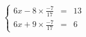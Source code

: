 \documentclass[preview]{standalone}
\begin{document}
\begin{align*}
\left\{ \begin{array}{rcl} 6x - 8\times\frac{-7}{17} & = & 13 \\6x + 9\times\frac{-7}{17}& = &6 \end{array} \right.
\end{align*}
\end{document}
